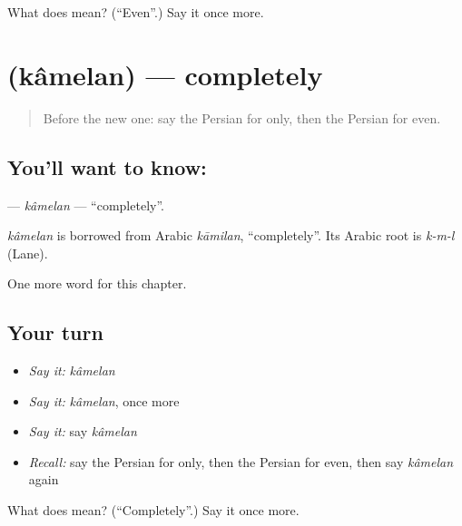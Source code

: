 \begin{tcolorbox}[breakable,colback=teal!4,colframe=teal!35!black,title={Before you move on}]
What does  mean? (\textquotedblleft{}Even\textquotedblright{}.) Say it once more.
\end{tcolorbox}
\section[\texorpdfstring{\fa{کاملا} (kâmelan)}{کاملا (kâmelan)}]{ (kâmelan) — completely}

\label{lesson:FA-C269-kamelan}



\begin{quote}
Before the new one: say the Persian for only, then the Persian for even.
\end{quote}

\subsection*{You'll want to know: }
\textbf{} — \emph{kâmelan} — \textquotedblleft{}completely\textquotedblright{}.

\begin{cousinweb}
\emph{kâmelan} is borrowed from Arabic \emph{kāmilan}, \textquotedblleft{}completely\textquotedblright{}. Its Arabic root is \emph{k-m-l} (Lane).
\end{cousinweb}

\begin{grammarlens}[title={What you've built}]
One more word for this chapter.
\end{grammarlens}

\subsection*{Your turn}
\begin{itemize}
\raggedright
  \item \emph{Say it:} \emph{kâmelan}
  \item \emph{Say it:} \emph{kâmelan}, once more
  \item \emph{Say it:} say \emph{kâmelan}
  \item \emph{Recall:} say the Persian for only, then the Persian for even, then say \emph{kâmelan} again
\end{itemize}

\begin{tcolorbox}[breakable,colback=teal!4,colframe=teal!35!black,title={Before you move on}]
What does  mean? (\textquotedblleft{}Completely\textquotedblright{}.) Say it once more.
\end{tcolorbox}
